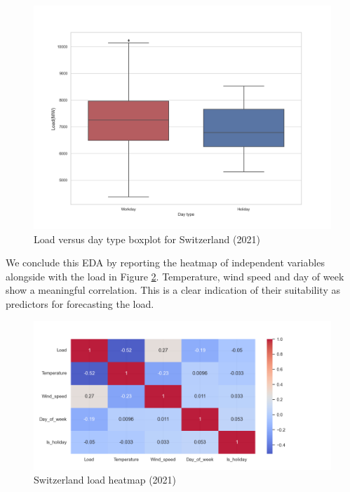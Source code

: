 \begin{figure}[!ht]
    \includegraphics[width=\textwidth]{images/CH_is_holiday_boxplot_2021.png}
    \caption{Load versus day type boxplot for Switzerland (2021)}
    \label{fig:CH_is_holiday_boxplot_2021}
\end{figure}

We conclude this EDA by reporting the heatmap of independent variables alongside with the load in Figure \ref{fig:CH_heatmap_2021}. Temperature, wind speed and day of week show a meaningful correlation. This is a clear indication of their suitability as predictors for forecasting the load.

\begin{figure}[!ht]
    \includegraphics[width=\textwidth]{images/CH_heatmap_2021.png}
    \caption{Switzerland load heatmap (2021)}
    \label{fig:CH_heatmap_2021}
\end{figure}